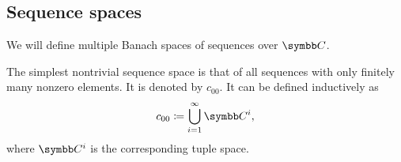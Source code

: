 \subsection{Sequence spaces}\label{subsec:sequence_spaces}

\begin{definition}\label{def:sequence_space}
  We will define multiple Banach spaces of sequences over \( \Co \).

  \begin{defenum}
     The simplest nontrivial sequence space is that of all sequences with only finitely many nonzero elements. It is denoted by \( c_{00} \). It can be defined inductively as
    \begin{equation*}
      c_{00} \coloneqq \bigcup_{i=1}^\infty \Co^i,
    \end{equation*}
    where \( \Co^i \) is the corresponding tuple space.
  \end{defenum}
\end{definition}
